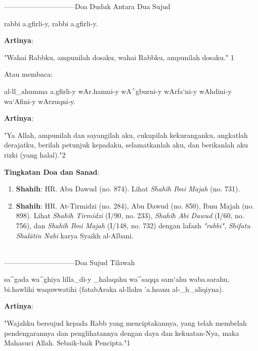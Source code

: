 \documentclass[a4paper,12pt]{article}
\begin{document}
\par
{}------------------------------Doa Duduk Antara Dua Sujud
\begin{arabtext}
\noindent
rabbi a.gfirli-y, rabbi a.gfirli-y.\\
\end{arabtext}
\noindent
\textbf{Artinya}:
\par
\indent
"Wahai Rabbku, ampunilah dosaku, wahai Rabbku, ampunilah dosaku."
{\scriptsize 1}\\
\par
\indent
Atau membaca:
\begin{arabtext}
\noindent
al-ll_ahumma a.gfirli-y wAr.hamni-y wA^gburni-y wArfa`ni-y wAhdini-y 
wa`Afini-y wArzuqni-y.\\
\end{arabtext}
\noindent
\textbf{Artinya}:
\par
\indent
"Ya Allah, ampunilah dan sayangilah aku, cukupilah kekuranganku, angkatlah 
derajatku, berilah petunjuk kepadaku, selamatkanlah aku, dan berikanlah aku
rizki (yang halal)."{\scriptsize 2}\\
\par
\noindent
\textbf{Tingkatan Doa dan Sanad}: 
\begin{enumerate}
\item \textbf{Shahih}: HR. Abu Dawud (no. 874). Lihat \textit{Shah\^{i}h 
Ibni Majah} (no. 731).
\item \textbf{Shahih}: HR. At-Tirmidzi (no. 284), Abu Dawud (no. 850), Ibnu
Majah (no. 898). Lihat \textit{Shah\^{i}h Tirmidzi} (I/90, no. 233), 
\textit{Shah\^{i}h Abi Dawud} (I/60, no. 756), dan \textit{Shah\^{i}h Ibni 
Majah} (I/148, no. 732) dengan lafazh \textit{"rabbi"}, \textit{Shifatu 
Shal\^{a}tin Nabi} karya Syaikh al-Albani.\\\\
\end{enumerate}
\par
{}------------------------------Doa Sujud Tilawah
\begin{arabtext}
\noindent
sa^gada wa^ghiya lilla_di-y _halaqahu wa^saqqa sam`ahu waba.sarahu, 
bi.hawlihi waquwwatihi (fatabAraka al-llahu 'a.hsanu al-_h_aliqiyna).\\
\end{arabtext}
\noindent
\textbf{Artinya}:
\par
\indent
"Wajahku bersujud kepada Rabb yang menciptakannya, yang telah membelah 
pendengarannya dan penglihatannya dengan daya dan kekuatan-Nya, maka 
Mahasuci Allah. Sebaik-baik Pencipta."{\scriptsize 1}\\
\end{document}
